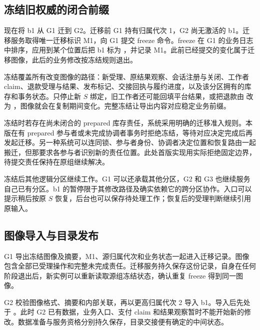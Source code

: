 \label{sec:ch17-business-migration}
\subsection*{冻结旧权威的闭合前缀}

现在将 b1 从 G1 迁到 G2。迁移前 G1 持有归属代次 1，G2 尚无激活的 b1。迁移服务取得唯一迁移标识 M1，向 G1 提交 freeze 命令。freeze 在 G1 的业务日志中排序，应用到某个位置后把 b1 标为 ，并记录 M1。此前已经提交的变化属于迁移图像，此后的业务修改按冻结规则退出。

冻结覆盖所有改变图像的路径：新受理、原结果观察、会话注册与关闭、工作者 claim、退款受理与结果、发布标记、交接回执与履约进度，以及该分区拥有的库存和事务状态。只停止新 $S$ 绑定，旧工作者还可能回填平台结果，或把退款由  改为 ，图像就会在复制期间变化。完整冻结让导出内容对应稳定业务前缀。


冻结时若存在尚未闭合的 prepared 库存责任，系统采用明确的迁移准入规则。本版在有 prepared 参与者或未完成协调者事务时拒绝冻结，等待对应决定完成后再发起迁移。另一种系统可以连同锁、参与者身份、协调者决定位置和恢复路由一起搬迁，但那要求各参与者识别新的责任位置。此处首版实现用实际拒绝固定边界，待提交责任保持在原组继续解决。


冻结后其他逻辑分区继续工作。G1 可以还承载其他分区，G2 和 G3 也继续服务自己已有分区。b1 的暂停限于其修改路径及确实依赖它的跨分区协作。入口可以提示稍后按原 $S$ 恢复，后台也可以保存待处理工作；恢复后的受理判断继续引用原输入。

\subsection*{图像导入与目录发布}

G1 导出冻结图像及摘要，M1、源归属代次和业务状态一起进入迁移记录。图像包含全部已受理操作和完整未完成责任。迁移服务持久保存这份记录，自身在任何阶段退出后，新实例可以重新读取源组冻结状态，确认重复 freeze 得到同一图像。

G2 校验图像格式、摘要和内部关联，再以更高归属代次 2 导入 b1。导入后先处于 。此时 G2 已有数据，业务入口、支付 claim 和结果观察暂时不能开始新的修改。数据准备与服务资格分别持久保存，目录交接便有确定的中间状态。

